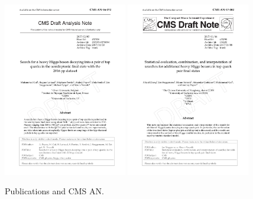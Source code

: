 \begin{figure}[!Hhtb]
\includegraphics[width=0.48\textwidth,keepaspectratio=true]{fig/front/AN_16_272.pdf}
\includegraphics[width=0.48\textwidth,keepaspectratio=true]{fig/front/AN_17_202.pdf}
\caption*{Publications and CMS AN.}
\label{fig:pub_an}
\end{figure}

\clearpage{\pagestyle{empty}\cleardoublepage}

\renewcommand*{\thesection}{\thechapter.\arabic{section}}       %



